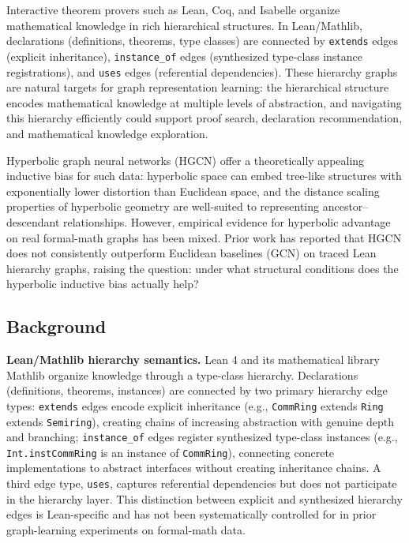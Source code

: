 \documentclass[runningheads]{llncs}
\begin{document}
Interactive theorem provers such as Lean, Coq, and Isabelle organize mathematical knowledge in rich hierarchical structures. In Lean/Mathlib, declarations (definitions, theorems, type classes) are connected by \texttt{extends} edges (explicit inheritance), \texttt{instance\_of} edges (synthesized type-class instance registrations), and \texttt{uses} edges (referential dependencies). These hierarchy graphs are natural targets for graph representation learning: the hierarchical structure encodes mathematical knowledge at multiple levels of abstraction, and navigating this hierarchy efficiently could support proof search, declaration recommendation, and mathematical knowledge exploration.

Hyperbolic graph neural networks (HGCN) offer a theoretically appealing inductive bias for such data: hyperbolic space can embed tree-like structures with exponentially lower distortion than Euclidean space, and the distance scaling properties of hyperbolic geometry are well-suited to representing ancestor--descendant relationships. However, empirical evidence for hyperbolic advantage on real formal-math graphs has been mixed. Prior work has reported that HGCN does not consistently outperform Euclidean baselines (GCN) on traced Lean hierarchy graphs, raising the question: under what structural conditions does the hyperbolic inductive bias actually help?

\subsection{Background}

\textbf{Lean/Mathlib hierarchy semantics.}
Lean 4 and its mathematical library Mathlib organize knowledge through a type-class hierarchy. Declarations (definitions, theorems, instances) are connected by two primary hierarchy edge types: \texttt{extends} edges encode explicit inheritance (e.g., \texttt{CommRing} extends \texttt{Ring} extends \texttt{Semiring}), creating chains of increasing abstraction with genuine depth and branching; \texttt{instance\_of} edges register synthesized type-class instances (e.g., \texttt{Int.instCommRing} is an instance of \texttt{CommRing}), connecting concrete implementations to abstract interfaces without creating inheritance chains. A third edge type, \texttt{uses}, captures referential dependencies but does not participate in the hierarchy layer. This distinction between explicit and synthesized hierarchy edges is Lean-specific and has not been systematically controlled for in prior graph-learning experiments on formal-math data.
\end{document}
